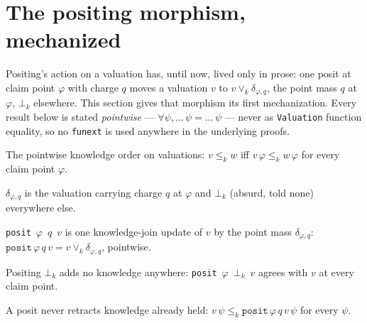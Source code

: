 \section{The positing morphism, mechanized}

Positing's action on a valuation has, until now, lived only in prose: one
posit at claim point \(\varphi\) with charge \(q\) moves a valuation \(v\) to
\(v \vee_k \delta_{\varphi,q}\), the point mass \(q\) at \(\varphi\), \(\bot_k\)
elsewhere. This section gives that morphism its first mechanization. Every
result below is stated \emph{pointwise} --- \(\forall \psi, \dots\,\psi =
\dots\,\psi\) --- never as \texttt{Valuation} function equality, so no
\texttt{funext} is used anywhere in the underlying proofs.

\begin{proposition}\label{thm:valuation-lek}\leanok{}
The pointwise knowledge order on valuations: \(v \le_k w\) iff
\(v\,\varphi \le_k w\,\varphi\) for every claim point \(\varphi\).
\end{proposition}

\begin{definition}\label{thm:delta}\leanok{}
\(\delta_{\varphi,q}\) is the valuation carrying charge \(q\) at \(\varphi\)
and \(\bot_k\) (absurd, told none) everywhere else.
\end{definition}

\begin{definition}\label{thm:posit}\leanok{}
\texttt{posit}~\(\varphi\)~\(q\)~\(v\) is one knowledge-join update of \(v\)
by the point mass \(\delta_{\varphi,q}\): \(\texttt{posit}\,\varphi\,q\,v =
v \vee_k \delta_{\varphi,q}\), pointwise.
\end{definition}

\begin{theorem}\label{thm:posit-kbot}\leanok{}
Positing \(\bot_k\) adds no knowledge anywhere: \texttt{posit}~\(\varphi\)~\(\bot_k\)~\(v\)
agrees with \(v\) at every claim point.
\end{theorem}

\begin{theorem}\label{thm:posit-inflationary}\leanok{}
A posit never retracts knowledge already held: \(v\,\psi \le_k
\texttt{posit}\,\varphi\,q\,v\,\psi\) for every \(\psi\).
\end{theorem}

